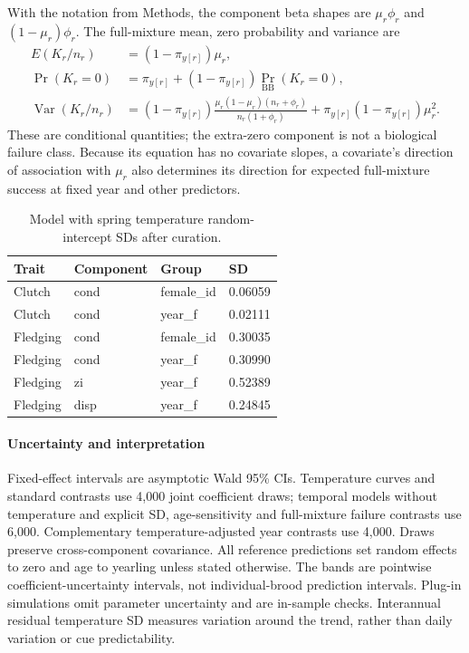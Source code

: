 \documentclass{article}
\begin{document}
With the notation from Methods, the component beta shapes are $\mu_r\phi_r$ and $(1-\mu_r)\phi_r$. The full-mixture mean, zero probability and variance are
\begin{align}
E(K_r/n_r)&=(1-\pi_{y[r]})\mu_r,\\
\Pr(K_r=0)&=\pi_{y[r]}+(1-\pi_{y[r]})\Pr_{\mathrm{BB}}(K_r=0),\\
\operatorname{Var}(K_r/n_r)&=(1-\pi_{y[r]})\frac{\mu_r(1-\mu_r)(n_r+\phi_r)}{n_r(1+\phi_r)}
+\pi_{y[r]}(1-\pi_{y[r]})\mu_r^2.
\end{align}
These are conditional quantities; the extra-zero component is not a biological failure class. Because its equation has no covariate slopes, a covariate's direction of association with $\mu_r$ also determines its direction for expected full-mixture success at fixed year and other predictors.

\begin{table}[!ht]\centering\scriptsize\singlespacing
\caption{Model with spring temperature random-intercept SDs after curation.}\label{tab:pooled-random}
\begin{tabular}{llll}\toprule
Trait & Component & Group & SD\\\midrule
Clutch & cond & female\_id & 0.06059\\
Clutch & cond & year\_f & 0.02111\\
Fledging & cond & female\_id & 0.30035\\
Fledging & cond & year\_f & 0.30990\\
Fledging & zi & year\_f & 0.52389\\
Fledging & disp & year\_f & 0.24845\\
\bottomrule\end{tabular}\end{table}

\paragraph{Uncertainty and interpretation}
Fixed-effect intervals are asymptotic Wald 95\% CIs. Temperature curves and standard contrasts use 4,000 joint coefficient draws; temporal models without temperature and explicit SD, age-sensitivity and full-mixture failure contrasts use 6,000. Complementary temperature-adjusted year contrasts use 4,000. Draws preserve cross-component covariance. All reference predictions set random effects to zero and age to yearling unless stated otherwise. The bands are pointwise coefficient-uncertainty intervals, not individual-brood prediction intervals. Plug-in simulations omit parameter uncertainty and are in-sample checks. Interannual residual temperature SD measures variation around the trend, rather than daily variation or cue predictability.
\end{document}
